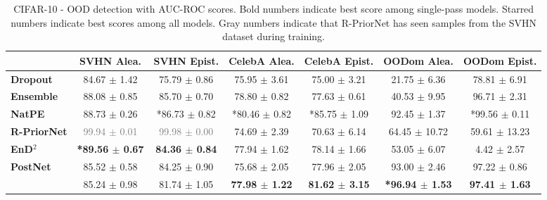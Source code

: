 \begin{table*}[ht]
    \centering
    \caption{CIFAR-10 - OOD detection with AUC-ROC scores. Bold numbers indicate best score among single-pass models. Starred numbers indicate best scores among all models. Gray numbers indicate that R-PriorNet has seen samples from the SVHN dataset during training.}
    \label{tab:auroc-cifar10}
    \scriptsize
    \begin{tabular}{lcccccc}
        \toprule
        & \textbf{SVHN Alea.} & \textbf{SVHN Epist.} & \textbf{CelebA Alea.} & \textbf{CelebA Epist.} & \textbf{OODom Alea.} & \textbf{OODom Epist.} \\
        \midrule
        \textbf{Dropout} & 84.67 $\pm$ 1.42 & 75.79 $\pm$ 0.86 & 75.95 $\pm$ 3.61 & 75.00 $\pm$ 3.21 & 21.75 $\pm$ 6.36 & 78.81 $\pm$ 6.91 \\
        \textbf{Ensemble} & 88.08 $\pm$ 0.85 & 85.70 $\pm$ 0.70 & 78.80 $\pm$ 0.82 & 77.63 $\pm$ 0.61 & 40.53 $\pm$ 9.95 & 96.71 $\pm$ 2.31 \\
        \textbf{NatPE} & 88.73 $\pm$ 0.26 & *86.73 $\pm$ 0.82 & *80.46 $\pm$ 0.82 & *85.75 $\pm$ 1.09 & 92.45 $\pm$ 1.37 & *99.56 $\pm$ 0.11 \\
        \midrule
        \textbf{R-PriorNet} & \textcolor{gray}{99.94 $\pm$ 0.01} & \textcolor{gray}{99.98 $\pm$ 0.00} & 74.69 $\pm$ 2.39 & 70.63 $\pm$ 6.14 & 64.45 $\pm$ 10.72 & 59.61 $\pm$ 13.23 \\
        \textbf{EnD$^2$} & \textbf{*89.56 $\pm$ 0.67} & \textbf{84.36 $\pm$ 0.84} & 77.94 $\pm$ 1.62 & 78.14 $\pm$ 1.66 & 53.05 $\pm$ 6.07 & 4.42 $\pm$ 2.57 \\
        \textbf{PostNet} & 85.52 $\pm$ 0.58 & 84.25 $\pm$ 0.90 & 75.68 $\pm$ 2.05 & 77.96 $\pm$ 2.05 & 93.00 $\pm$ 2.46 & 97.22 $\pm$ 0.86 \\
        \textbf{\NatPNacro{}} & 85.24 $\pm$ 0.98 & 81.74 $\pm$ 1.05 & \textbf{77.98 $\pm$ 1.22} & \textbf{81.62 $\pm$ 3.15} & \textbf{*96.94 $\pm$ 1.53} & \textbf{97.41 $\pm$ 1.63} \\
        \bottomrule
    \end{tabular}
\end{table*}
